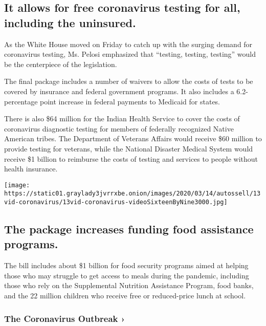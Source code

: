 \hypertarget{it-allows-for-free-coronavirus-testing-for-all-including-the-uninsured}{%
\subsection{It allows for free coronavirus testing for all, including
the
uninsured.}\label{it-allows-for-free-coronavirus-testing-for-all-including-the-uninsured}}

As the White House moved on Friday to catch up with the surging demand
for coronavirus testing, Ms. Pelosi emphasized that ``testing, testing,
testing'' would be the centerpiece of the legislation.

The final package includes a number of waivers to allow the costs of
tests to be covered by insurance and federal government programs. It
also includes a 6.2-percentage point increase in federal payments to
Medicaid for states.

There is also \$64 million for the Indian Health Service to cover the
costs of coronavirus diagnostic testing for members of federally
recognized Native American tribes. The Department of Veterans Affairs
would receive \$60 million to provide testing for veterans, while the
National Disaster Medical System would receive \$1 billion to reimburse
the costs of testing and services to people without health insurance.

\texttt{[image: https://static01.graylady3jvrrxbe.onion/images/2020/03/14/autossell/13vid-coronavirus/13vid-coronavirus-videoSixteenByNine3000.jpg]}

\hypertarget{the-package-increases-funding-food-assistance-programs}{%
\subsection{The package increases funding food assistance
programs.}\label{the-package-increases-funding-food-assistance-programs}}

The bill includes about \$1 billion for food security programs aimed at
helping those who may struggle to get access to meals during the
pandemic, including those who rely on the Supplemental Nutrition
Assistance Program, food banks, and the 22 million children who receive
free or reduced-price lunch at school.

\href{https://www.nytimes3xbfgragh.onion/news-event/coronavirus?action=click\&pgtype=Article\&state=default\&region=MAIN_CONTENT_3\&context=storylines_faq}{}

\hypertarget{the-coronavirus-outbreak-}{%
\subsubsection{The Coronavirus Outbreak
›}\label{the-coronavirus-outbreak-}}

